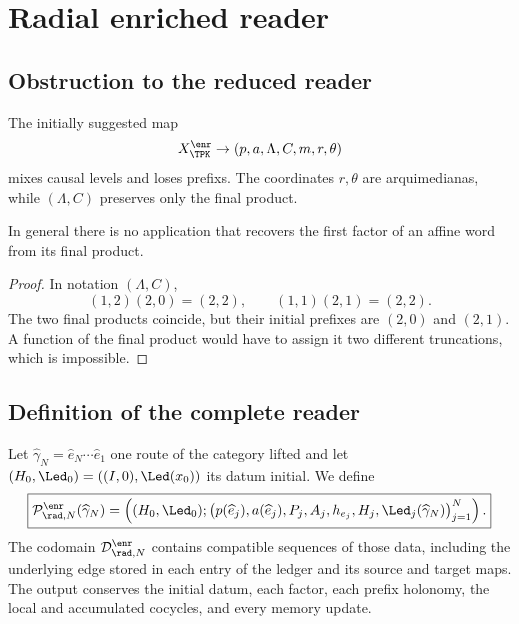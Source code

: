 \chapter{Radial enriched reader}

\section{Obstruction to the reduced reader}

The initially suggested map
\[
 X_{\TPK}^{\enr}\to(p,a,\Lambda,C,m,r,\theta)
\]
mixes causal levels and loses prefixs. The coordinates \(r,\theta\) are
arquimedianas, while \((\Lambda,C)\) preserves only the final product.

\begin{proposition}
In general there is no application that recovers the first factor of an
affine word from its final product.
\end{proposition}
\begin{proof}
In notation \((\Lambda,C)\),
\[
 (1,2)(2,0)=(2,2),
 \qquad
 (1,1)(2,1)=(2,2).
\]
The two final products coincide, but their initial prefixes are
\((2,0)\) and \((2,1)\). A function of the final product would have
to assign it two different truncations, which is impossible.
\end{proof}

\section{Definition of the complete reader}

Let
\(\widehat\gamma_N=\widehat e_N\cdots\widehat e_1\) one route of the
category lifted and let \((H_0,\Led_0)=((I,0),\Led(x_0))\) its datum
initial. We define
\begin{equation}
 \boxed{
 \mathcal P_{\rad,N}^{\enr}(\widehat\gamma_N)
 =\left(
 (H_0,\Led_0);
 \bigl(p(\widehat e_j),a(\widehat e_j),P_j,A_j,
 h_{e_j},H_j,\Led_j(\widehat\gamma_N)\bigr)_{j=1}^{N}
 \right).}
 \label{espiral:eq:lector-radial-enriquecido}
\end{equation}
The codomain \(\mathcal D_{\rad,N}^{\enr}\) contains compatible sequences
of those data, including the underlying edge stored in each entry of the
ledger and its source and target maps. The output conserves the initial datum,
each factor, each prefix holonomy, the local and accumulated cocycles, and every
memory update.


